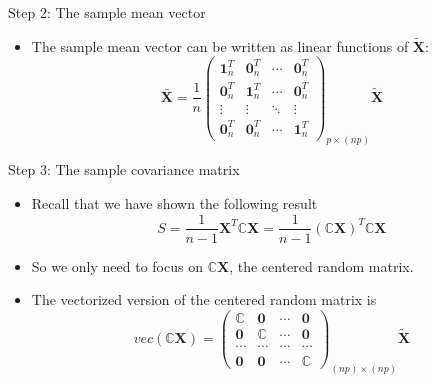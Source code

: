 \documentclass[
  ignorenonframetext,
]{beamer}
\providecommand{\tightlist}{%
  \setlength{\itemsep}{0pt}\setlength{\parskip}{0pt}}
\begin{document}
\begin{frame}{Step 2: The sample mean vector}
\protect\hypertarget{step-2-the-sample-mean-vector}{}
\begin{itemize}
\tightlist
\item
  The sample mean vector can be written as linear functions of
  \(\tilde {\mathbf X}\):
  \[\bar{\mathbf X}=\frac{1}{n} \begin{pmatrix} \mathbf 1_n^T & \mathbf 0_n^T & \cdots &\mathbf 0_n^T \\
  \mathbf 0_n^T & \mathbf 1_n^T & \cdots &\mathbf 0_n^T \\
  \vdots & \vdots & \ddots & \vdots \\
  \mathbf 0_n^T & \mathbf 0_n^T & \cdots &\mathbf 1_n^T 
  \end{pmatrix}_{p\times (np)} \tilde {\mathbf X}\]
\end{itemize}
\end{frame}

\begin{frame}{Step 3: The sample covariance matrix}
\protect\hypertarget{step-3-the-sample-covariance-matrix}{}
\begin{itemize}
\tightlist
\item
  Recall that we have shown the following result
  \[S=\frac{1}{n-1} \mathbf X^T \mathbb C \mathbf X= \frac{1}{n-1} (\mathbb C \mathbf X)^T \mathbb C \mathbf X\]
\item
  So we only need to focus on \(\mathbb C \mathbf X\), the centered
  random matrix.
\item
  The vectorized version of the centered random matrix is
  \[vec(\mathbb C \mathbf X) = 
  \begin{pmatrix}
  \mathbb C & \mathbf 0 & \cdots & \mathbf 0\\
  \mathbf 0 & \mathbb C & \cdots & \mathbf 0\\
  \cdots & \cdots & \cdots & \cdots\\
  \mathbf 0 & \mathbf 0 & \cdots & \mathbb C
  \end{pmatrix}_{(np)\times (np)} \tilde {\mathbf X}
  \]
\end{itemize}
\end{frame}
\end{document}

